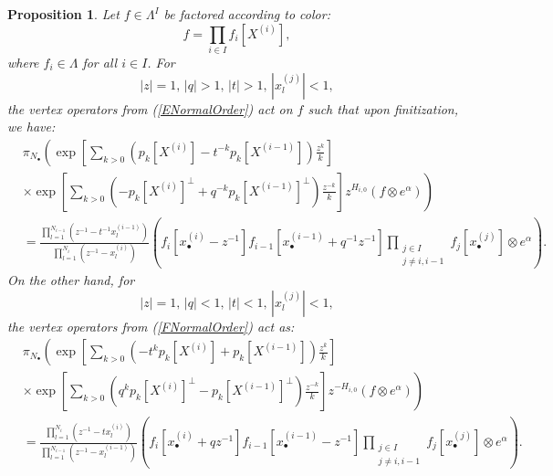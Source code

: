 \documentclass{amsart}
\newtheorem{prop}[thm]{Proposition}
\theoremstyle{remark}
\numberwithin{thm}{section}
\numberwithin{equation}{section}
\begin{document}
\begin{prop}\label{FiniteVert}
    Let $f\in\Lambda^I$ be factored according to color:
    \[
    f= \prod_{i\in I} f_i[X^{(i)}],
    \]
    where $f_i\in\Lambda$ for all $i\in I$.
    For
    \begin{equation}
    |z|=1,\, |q|>1,\, |t|>1,\, |x_{l}^{(j)}|<1,
    \label{EExpand0}
    \end{equation}
    the vertex operators from (\ref{ENormalOrder}) act on $f$ such that upon finitization, we have:
\begin{equation}
\label{FinEVertex}
    \begin{aligned}
    &\pi_{N_\bullet} \left(\exp\left[ \sum_{k>0}\left( p_k[X^{(i)}]-t^{-k}p_k[X^{(i-1)}] \right) \frac{z^k}{k}\right]\right.\\
    &\times\left.\exp\left[\sum_{k>0}\left( -p_k[X^{(i)}]^\perp+q^{-k}p_k[X^{(i-1)}]^\perp \right)\frac{z^{-k}}{k}  \right]z^{H_{i,0}} (f\otimes e^\alpha)\right) \\
    &=
    \frac{\displaystyle\prod_{l=1}^{N_{i-1}}\left(z^{-1}-t^{-1}x_{l}^{(i-1)}\right)}{\displaystyle\prod_{l=1}^{N_i} \left(z^{-1}-x_{l}^{(i)}\right)}
    \left( f_i\left[x_{\bullet}^{(i)}-z^{-1}\right]f_{i-1}\left[x_{\bullet}^{(i-1)}+q^{-1}z^{-1}\right]
    \prod_{\substack{j\in I\\j\not=i,i-1}} f_j\left[x_{\bullet}^{(j)}\right]\otimes e^\alpha\right).
    \end{aligned}
\end{equation}
    On the other hand, for
    \begin{equation*}
    |z|=1,\, |q|<1,\, |t|<1,\, |x_{l}^{(j)}|<1,
    \label{FExpand0}
    \end{equation*}
    the vertex operators from (\ref{FNormalOrder}) act as:
\begin{equation}
\label{FinFVertex}
    \begin{aligned}
    &\pi_{N_\bullet} \left(\exp\left[ \sum_{k>0}\left( -t^kp_k[X^{(i)}]+p_k[X^{(i-1)}] \right) \frac{z^k}{k}\right]\right.\\
    &\times \left.\exp\left[\sum_{k>0}\left( q^kp_k[X^{(i)}]^\perp-p_k[X^{(i-1)}]^\perp \right)\frac{z^{-k}}{k}  \right]z^{-H_{i,0}} (f\otimes e^\alpha)\right) \\
    &=
    \frac{\displaystyle\prod_{l=1}^{N_{i}}\left(z^{-1}-tx_{l}^{(i)}\right)}
    {\displaystyle\prod_{l=1}^{N_{i-1}} \left(z^{-1}-x_{l}^{(i-1)}\right)}
    \left( f_i\left[x_{\bullet}^{(i)}+qz^{-1}\right]f_{i-1}\left[x_{\bullet}^{(i-1)}-z^{-1}\right]
    \prod_{\substack{j\in I\\j\not=i,i-1}} f_j\left[x_{\bullet}^{(j)}\right]\otimes e^\alpha\right).
    \end{aligned}
\end{equation}
\end{prop}
\end{document}
